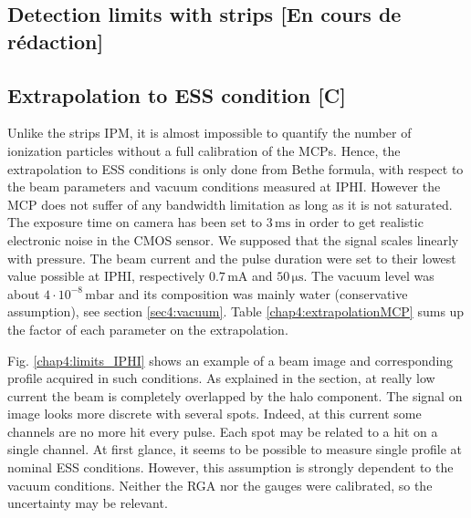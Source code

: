 \begin{refsection}
  \subsection{Detection limits with strips [En cours de rédaction]}

  \subsection{Extrapolation to ESS condition [C]}
  Unlike the strips IPM, it is almost impossible to quantify the number of ionization particles without a full calibration of the MCPs. Hence, the extrapolation to ESS conditions is only done from Bethe formula, with respect to the beam parameters and vacuum conditions measured at IPHI.
  However the MCP does not suffer of any bandwidth limitation as long as it is not saturated. The exposure time on camera has been set to $3\,\mathrm{ms}$ in order to get realistic electronic noise in the CMOS sensor.
  We supposed that the signal scales linearly with pressure. The beam current and the pulse duration were set to their lowest value possible at IPHI, respectively $0.7\,\mathrm{mA}$ and $50\, \mathrm{\mu s}$. The vacuum level was about $4 \cdot 10^{-8}\,\mathrm{mbar}$ and its composition was mainly water (conservative assumption), see section \ref{sec4:vacuum}. Table \ref{chap4:extrapolationMCP} sums up the factor of each parameter on the extrapolation.
  

  Fig. \ref{chap4:limits_IPHI} shows an example of a beam image and corresponding profile acquired in such conditions. As explained in the section, at really low current the beam is completely overlapped by the halo component. The signal on image looks more discrete with several spots. Indeed, at this current some channels are no more hit every pulse. Each spot may be related to a hit on a single channel.
  At first glance, it seems to be possible to measure single profile at nominal ESS conditions. However, this assumption is strongly dependent to the vacuum conditions. Neither the RGA nor the gauges were calibrated, so the uncertainty may be relevant.

  


\end{refsection}

